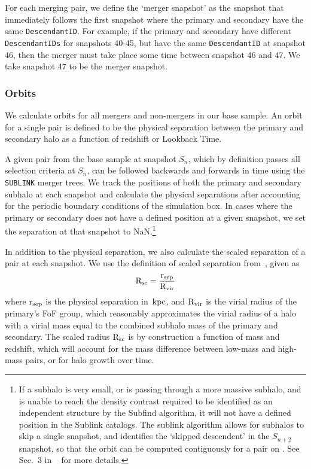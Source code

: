 \documentclass[twocolumn]{aastex631}
\newcommand{\Rvir}{\ensuremath{\rm R_{vir}}}
\newcommand{\Rsc}{\ensuremath{\rm R_{sc}}}
\newcommand{\rsep}{\ensuremath{\rm r_{sep}}}
\begin{document}
For each merging pair, we define the `merger snapshot' as the snapshot that immediately follows the first snapshot where the primary and secondary have the same \texttt{DescendantID}. 
For example, if the primary and secondary have different \texttt{DescendantIDs} for snapshots 40-45, but have the same \texttt{DescendantID} at snapshot 46, then the merger must take place some time between snapshot 46 and 47. 
We take snapshot 47 to be the merger snapshot. 



\subsubsection{Orbits} 
We calculate orbits for all mergers and non-mergers in our base sample. 
An orbit for a single pair is defined to be the physical separation between the primary and secondary halo as a function of redshift or Lookback Time. 

A given pair from the base sample at snapshot $S_n$, which by definition passes all selection criteria at $S_n$, can be followed backwards and forwards in time using the \texttt{SUBLINK} merger trees.  
We track the positions of both the primary and secondary subhalo at each snapshot and calculate the physical separations after accounting for the periodic boundary conditions of the simulation box.
In cases where the primary or secondary does not have a defined position at a given snapshot, we set the separation at that snapshot to NaN.\footnote{If a subhalo is very small, or is passing through a more massive subhalo, and is unable to reach the density contrast required to be identified as an independent structure by the Subfind algorithm, it will not have a defined position in the Sublink catalogs. The sublink algorithm allows for subhalos to skip a single snapshot, and identifies the `skipped descendent' in the $S_{n+2}$ snapshot, so that the orbit can be computed contiguously for a pair on . See Sec.~3 in ~\citet{RG2015} for more details.}

In addition to the physical separation, we also calculate the scaled separation of a pair at each snapshot. We use the definition of scaled separation from~\cite{Chamberlain2024}, given as
\begin{equation}
    \rm \Rsc = \frac{\rsep}{\Rvir}
\end{equation}
where $\rsep$ is the physical separation in $\mathrm{\,kpc}$, and $\Rvir$ is the virial radius of the primary's FoF group, which reasonably approximates the virial radius of a halo with a virial mass equal to the combined subhalo mass of the primary and secondary.
The scaled radius $\Rsc$ is by construction a function of mass and redshift, which will account for the mass difference between low-mass and high-mass pairs, or for halo growth over time. 
\end{document}
